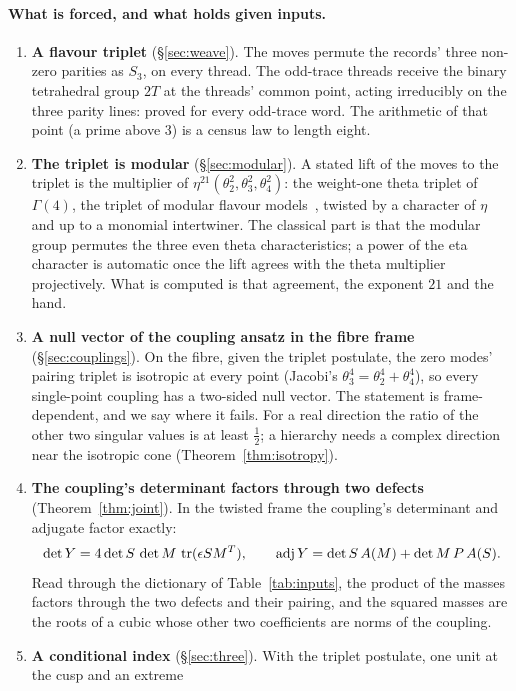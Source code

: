 \paragraph{What is forced, and what holds given inputs.}
\begin{enumerate}
\item \textbf{A flavour triplet} (\S\ref{sec:weave}). The moves permute the records' three non-zero parities as
  $S_3$, on every thread. The odd-trace threads receive the binary tetrahedral group $2T$ at the threads' common
  point, acting irreducibly on the three parity lines: proved for every odd-trace word. The arithmetic of that point (a prime above $3$) is a census law to length eight.
\item \textbf{The triplet is modular} (\S\ref{sec:modular}). A stated lift of the moves to the triplet is the multiplier of
  $\eta^{21}(\theta_2^2,\theta_3^2,\theta_4^2)$: the weight-one theta triplet of $\Gamma(4)$, the triplet of modular
  flavour models~\cite{NovichkovPenedoPetcov2021}, twisted by a character of $\eta$ and up to a monomial intertwiner.
  The classical part is that the modular group permutes the three even theta characteristics; a power of the eta
  character is automatic once the lift agrees with the theta multiplier projectively. What is computed is that
  agreement, the exponent $21$ and the hand.
\item \textbf{A null vector of the coupling ansatz in the fibre frame} (\S\ref{sec:couplings}). On the fibre, given the triplet
  postulate, the zero modes' pairing triplet is isotropic at every point (Jacobi's
  $\theta_3^4=\theta_2^4+\theta_4^4$), so every single-point coupling has a two-sided null vector. The statement is
  frame-dependent, and we say where it fails. For a real direction the ratio of the other two singular values is at least $\tfrac12$; a hierarchy needs a complex direction near the isotropic cone (Theorem~\ref{thm:isotropy}).
\item \textbf{The coupling's determinant factors through two defects} (Theorem~\ref{thm:joint}). In the twisted frame the coupling's
  determinant and adjugate factor exactly:
  \[
    \det Y = 4\det S\,\det M\,\operatorname{tr}(\epsilon S M^{T}),\qquad
    \operatorname{adj} Y = \det S\,A(M)+\det M\,P\,A(S).
  \]
  Read through the dictionary of Table~\ref{tab:inputs}, the product of the masses factors through the two defects and their
  pairing, and the squared masses are the roots of a cubic whose other two coefficients are norms of the coupling.
\item \textbf{A conditional index} (\S\ref{sec:three}). With the triplet postulate, one unit at the cusp and an extreme

\end{enumerate}
